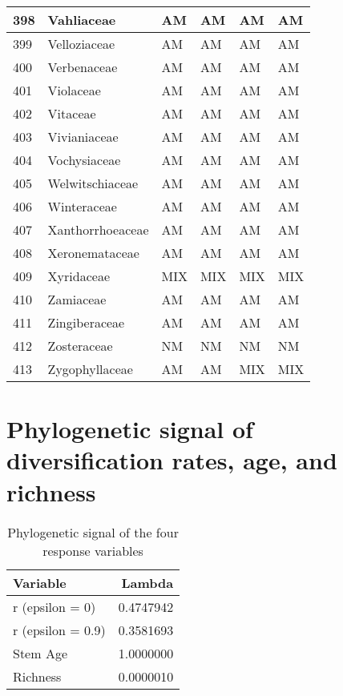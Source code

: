 \documentclass[]{article}
\begin{document}
\begin{longtable}{l|l|l|l|l|l}
\hline
398 & Vahliaceae & AM & AM & AM & AM\\
\hline
399 & Velloziaceae & AM & AM & AM & AM\\
\hline
400 & Verbenaceae & AM & AM & AM & AM\\
\hline
401 & Violaceae & AM & AM & AM & AM\\
\hline
402 & Vitaceae & AM & AM & AM & AM\\
\hline
403 & Vivianiaceae & AM & AM & AM & AM\\
\hline
404 & Vochysiaceae & AM & AM & AM & AM\\
\hline
405 & Welwitschiaceae & AM & AM & AM & AM\\
\hline
406 & Winteraceae & AM & AM & AM & AM\\
\hline
407 & Xanthorrhoeaceae & AM & AM & AM & AM\\
\hline
408 & Xeronemataceae & AM & AM & AM & AM\\
\hline
409 & Xyridaceae & MIX & MIX & MIX & MIX\\
\hline
410 & Zamiaceae & AM & AM & AM & AM\\
\hline
411 & Zingiberaceae & AM & AM & AM & AM\\
\hline
412 & Zosteraceae & NM & NM & NM & NM\\
\hline
413 & Zygophyllaceae & AM & AM & MIX & MIX\\
\hline
\end{longtable}

\hypertarget{phylogenetic-signal-of-diversification-rates-age-and-richness}{%
\section{Phylogenetic signal of diversification rates, age, and
richness}\label{phylogenetic-signal-of-diversification-rates-age-and-richness}}

\begin{table}[H]

\caption{\label{tab:unnamed-chunk-6}Phylogenetic signal of the four response variables}
\centering
\begin{tabular}{l|r}
\hline
Variable & Lambda\\
\hline
r (epsilon = 0) & 0.4747942\\
\hline
r (epsilon = 0.9) & 0.3581693\\
\hline
Stem Age & 1.0000000\\
\hline
Richness & 0.0000010\\
\hline
\end{tabular}
\end{table}
\end{document}
